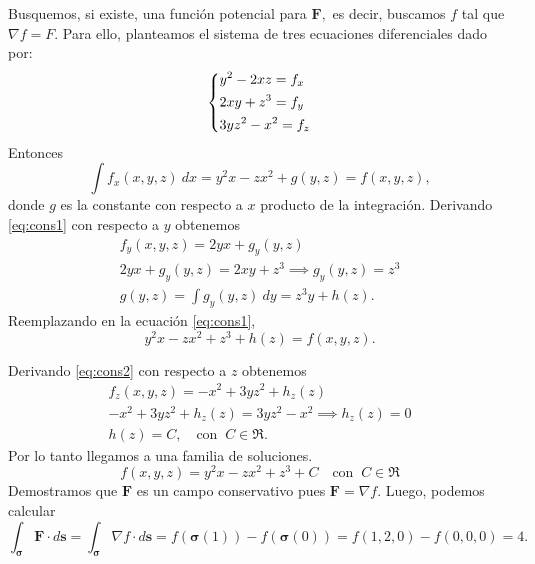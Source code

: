 \begin{solution}
   Busquemos, si existe,  una funci\'on potencial para $\mathbf{F},$ es decir, buscamos $f$ tal que $\nabla f = F.$ Para ello,  planteamos el sistema de tres ecuaciones diferenciales dado por:
    \[\begin{dcases}
        y^2-2xz=f_x\\
        2xy+z^3=f_y\\
        3yz^2-x^2=f_z
    \end{dcases}\]
    Entonces 
    \begin{equation}
    \int f_x(x,y,z)\:dx=y^2x-zx^2+g(y,z)=f(x,y,z), \label{eq:cons1}
    \end{equation}
    donde $g$ es la constante con respecto a $x$ producto de la integraci\'on. Derivando \ref{eq:cons1} con respecto a $y$ obtenemos 
    \begin{gather*}
     f_y(x,y,z)= 2yx+g_y(y,z)\\[.2cm]
     2yx+g_y(y,z)  = 2xy+z^3 \implies g_y(y,z)=z^3\\[.2cm]
    g(y,z)=\int  g_y(y,z) \:dy =  z^3y+h(z).
    \end{gather*}
Reemplazando en  la ecuaci\'on \ref{eq:cons1},
\begin{equation}
    y^2x-zx^2+z^3+h(z) =  f(x,y,z).   \label{eq:cons2}
\end {equation}  

Derivando \ref{eq:cons2} con respecto a $z$ obtenemos 
 \begin{gather*}
 f_z(x,y,z)=-x^2+3yz^2+h_z(z)\\ 
 -x^2+3yz^2+h_z(z)=3yz^2-x^2   \implies h_z(z) =0 \\[.2cm]
   h(z) = C,  \quad\text{con}\;\;C\in\Re.
    \end{gather*}
    Por lo tanto llegamos a una familia de soluciones.
    \[
    f(x,y,z)=y^2x-zx^2+z^3+C  \quad\text{con}\;\;C\in\Re
    \]
   Demostramos que $\mathbf{F}$ es un campo conservativo pues $\mathbf{F}=\nabla f.$ Luego, podemos calcular
    \[
    \int _{\boldsymbol{\sigma}} \mathbf{F}\cdot d\mathbf{s}=
    \int _{\boldsymbol{\sigma}} \nabla f\cdot d\mathbf{s} = f(\boldsymbol{\sigma}(1))-f(\boldsymbol{\sigma}(0))=f(1,2,0)-f(0,0,0)=4.
    \]
\end{solution}


